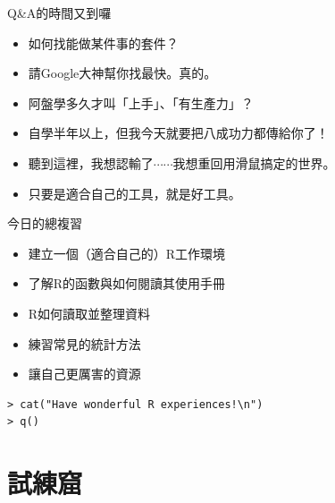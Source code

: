 \documentclass[14pt, aspectratio=43]{beamer}
\begin{document}
\begin{frame}[fragile]{Q\&A的時間又到囉}
\begin{itemize}
\item[Q] 如何找能做某件事的套件？
\item[A] 請Google大神幫你找最快。真的。
\end{itemize}
\begin{itemize}
\item[Q] 阿盤學多久才叫「上手」、「有生產力」？
\item[A] 自學半年以上，但我今天就要把八成功力都傳給你了！
\end{itemize}
\begin{itemize}\item[Q] 聽到這裡，我想認輸了$\cdots\cdots$我想重回用滑鼠搞定的世界。
\item[A] 只要是適合自己的工具，就是好工具。
\end{itemize}
\end{frame}

\begin{frame}[fragile]{今日的總複習}
\begin{itemize}
\item 建立一個（適合自己的）R工作環境
\item 了解R的函數與如何閱讀其使用手冊
\item R如何讀取並整理資料
\item 練習常見的統計方法
\item 讓自己更厲害的資源
\end{itemize}

\large
\begin{verbatim}
> cat("Have wonderful R experiences!\n")
> q()
\end{verbatim}

\end{frame}



\section{試練窟}\subsection{}
\end{document}
